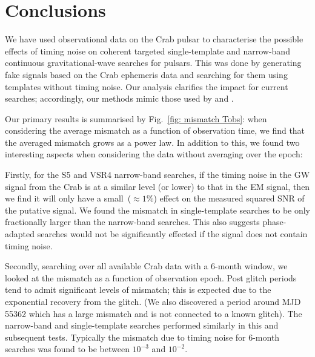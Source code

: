 \documentclass[../full_thesis/full_thesis.tex]{subfiles}
\begin{document}

\section{Conclusions}
\label{sec: narrow-band conclusions}
We have used observational data on the Crab pulsar to characterise the possible
effects of timing noise on coherent targeted single-template  and narrow-band
continuous gravitational-wave searches for pulsars.  This was done by generating fake
signals based on the Crab ephemeris data and searching for them using templates
without timing noise. Our analysis clarifies the impact for current searches;
accordingly, our methods mimic those used by \citet{ligo2008} and \citet{ligo2015}.

Our primary results is summarised by Fig.~\ref{fig: mismatch Tobs}:
when considering the average mismatch as
a function of observation time,  we find that the averaged
mismatch grows as a power law. In addition to this, we found two interesting
aspects when considering the data without averaging over the epoch:

Firstly, for the S5 and VSR4 narrow-band searches, if the timing noise in the
GW signal from the Crab is at a similar level (or lower) to that in the EM
signal, then we find it will only have a small~($\approx1\%$) effect on the
measured squared SNR of the putative signal.  We found the mismatch in
single-template searches to be only fractionally larger than the narrow-band
searches.  This also suggests phase-adapted searches would not be significantly
effected if the signal does not contain timing noise.

Secondly, searching over all available Crab data with a 6-month window, we
looked at the mismatch as a function of observation epoch. Post glitch periods
tend to admit significant levels of mismatch; this is expected due to the
exponential recovery from the glitch. (We also discovered a period around MJD
55362 which has a large mismatch and is not connected to a known glitch). The
narrow-band and single-template searches performed similarly in this and
subsequent tests. Typically the mismatch due to timing noise for 6-month
searches was found to be between $10^{-3}$ and $10^{-2}$.
\end{document}

